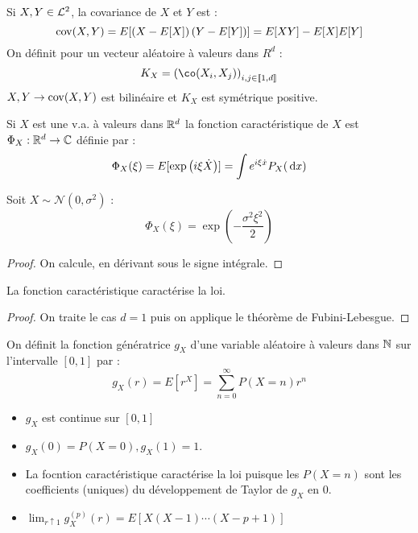 \documentclass{cours}
\begin{document}
    \begin{definition}
        Si $X, Y \in \mathcal{L}^{2}$, la covariance de $X$ et $Y$ est :
        \[
            \operatorname{cov}(X, Y) = E[\left(X - E[X]\right)\left(Y - E[Y]\right)] = E[XY] - E[X]E[Y]
        \]
        On définit pour un vecteur aléatoire à valeurs dans $R^{d}$ : 
        \[
            K_{X} = \left(\co(X_{i}, X_{j})\right)_{i, j \in \llbracket 1,d\rrbracket}
        \]
        $X, Y \rightarrow \operatorname{cov}(X, Y)$ est bilinéaire et $K_{X}$ est symétrique positive. 
    \end{definition}

    \begin{definition}
        Si $X$ est une v.a. à valeurs dans $\mathbb{R}^{d}$ la fonction caractéristique de $X$ est $\Phi_{X} : \mathbb{R}^{d} \rightarrow \mathbb{C}$ définie par : 
        \[
            \Phi_{X}(\xi) = E[\exp\left(i\xi \dot X\right)] = \int e^{i\xi \dot x}P_{X}({\rm \, d} x)
        \]
    \end{definition}

    \begin{lemma}
        Soit $X \sim \mathcal{N}(0, \sigma^{2})$ : 
        \[
            \Phi_{X}(\xi) = \exp\left(-\frac{\sigma^{2}\xi^{2}}{2}\right)
        \]
    \end{lemma}
    \begin{proof}
        On calcule, en dérivant sous le signe intégrale. 
    \end{proof}

    \begin{theorem}
        La fonction caractéristique caractérise la loi.
    \end{theorem}
    \begin{proof}
        On traite le cas $d = 1$ puis on applique le théorème de Fubini-Lebesgue.
    \end{proof}

    \begin{definition}
        On définit la fonction génératrice $g_{X}$ d'une variable aléatoire à valeurs dans $\mathbb{N}$ sur l'intervalle $\left[0, 1\right]$ par : 
        \[
            g_{X}(r) = E[r^{X}] = \sum_{n = 0}^{\infty}P(X = n)r^{n}
        \]
    \end{definition}

    \begin{proposition}
        \begin{itemize}
            \item $g_{X}$ est continue sur $\left[0, 1\right]$
            \item $g_{X}(0) = P(X = 0), g_{X}(1) = 1$.
            \item La focntion caractéristique caractérise la loi puisque les $P(X = n)$ sont les coefficients (uniques) du développement de Taylor de $g_{X}$ en $0$.
            \item $\lim_{r \uparrow 1}g_{X}^{(p)}(r) = E\left[X(X - 1)\cdots(X - p + 1)\right]$
        \end{itemize}
    \end{proposition}
\end{document}
